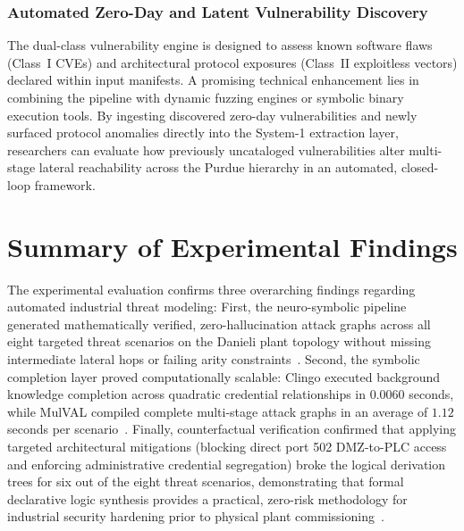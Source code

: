 \documentclass[target=mst,aauheader=aics,style=]{thud}
\begin{document}
\subsubsection{Automated Zero-Day and Latent Vulnerability Discovery}
The dual-class vulnerability engine is designed to assess known software flaws (Class~I CVEs) and architectural protocol exposures (Class~II exploitless vectors) declared within input manifests. A promising technical enhancement lies in combining the pipeline with dynamic fuzzing engines or symbolic binary execution tools. By ingesting discovered zero-day vulnerabilities and newly surfaced protocol anomalies directly into the System-1 extraction layer, researchers can evaluate how previously uncataloged vulnerabilities alter multi-stage lateral reachability across the Purdue hierarchy in an automated, closed-loop framework.

\section{Summary of Experimental Findings}
\label{sec:findings_summary}

The experimental evaluation confirms three overarching findings regarding automated industrial threat modeling:
First, the neuro-symbolic pipeline generated mathematically verified, zero-hallucination attack graphs across all eight targeted threat scenarios on the Danieli plant topology without missing intermediate lateral hops or failing arity constraints~\cite{alviano2025llmasp}.
Second, the symbolic completion layer proved computationally scalable: Clingo executed background knowledge completion across quadratic credential relationships in $0.0060$ seconds, while MulVAL compiled complete multi-stage attack graphs in an average of $1.12$ seconds per scenario~\cite{clingo, swift2012xsb}.
Finally, counterfactual verification confirmed that applying targeted architectural mitigations (blocking direct port 502 DMZ-to-PLC access and enforcing administrative credential segregation) broke the logical derivation trees for six out of the eight threat scenarios, demonstrating that formal declarative logic synthesis provides a practical, zero-risk methodology for industrial security hardening prior to physical plant commissioning~\cite{SunderOT}.

\end{document}
